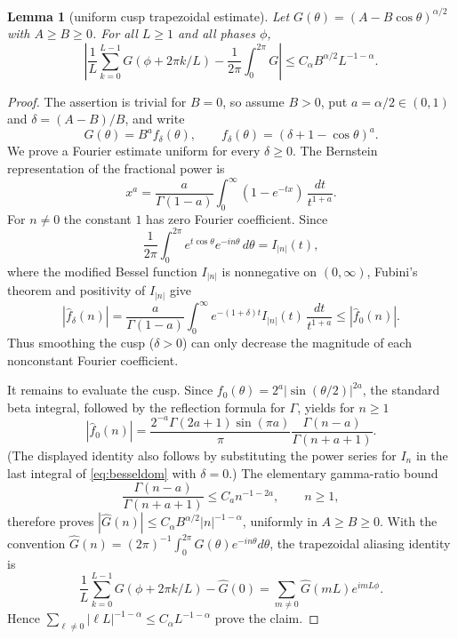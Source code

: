 \documentclass[11pt]{amsart}
\newtheorem{lemma}[theorem]{Lemma}
\begin{document}
\begin{lemma}[uniform cusp trapezoidal estimate]\label{lem:trap}
Let $G(\theta)=(A-B\cos\theta)^{\alpha/2}$ with $A\ge B\ge0$.  For all
$L\ge1$ and all phases $\phi$,
\[
 \left|\frac1L\sum_{k=0}^{L-1}G(\phi+2\pi k/L)
 -\frac1{2\pi}\int_0^{2\pi}G\right|
 \le C_\alpha B^{\alpha/2}L^{-1-\alpha}.             \tag{4.1}
\]
\end{lemma}

\begin{proof}
The assertion is trivial for $B=0$, so assume $B>0$, put
$a=\alpha/2\in(0,1)$ and $\delta=(A-B)/B$, and write
\[
 G(\theta)=B^a f_\delta(\theta),\qquad
 f_\delta(\theta)=(\delta+1-\cos\theta)^a.
\]
We prove a Fourier estimate uniform for every $\delta\ge0$.  The Bernstein
representation of the fractional power is
\[
 x^a=\frac{a}{\Gamma(1-a)}\int_0^\infty
 (1-e^{-tx})\,\frac{dt}{t^{1+a}}.
\]
For $n\ne0$ the constant $1$ has zero Fourier coefficient.  Since
\[
 \frac1{2\pi}\int_0^{2\pi}e^{t\cos\theta}e^{-in\theta}\,d\theta=I_{|n|}(t),
\]
where the modified Bessel function $I_{|n|}$ is nonnegative on $(0,\infty)$,
Fubini's theorem and positivity of $I_{|n|}$ give
\begin{equation}\label{eq:besseldom}
 |\widehat f_\delta(n)|
 =\frac{a}{\Gamma(1-a)}\int_0^\infty
 e^{-(1+\delta)t}I_{|n|}(t)\,\frac{dt}{t^{1+a}}
 \le |\widehat f_0(n)|.                              \tag{4.2}
\end{equation}
Thus smoothing the cusp ($\delta>0$) can only decrease the magnitude of
each nonconstant Fourier coefficient.

It remains to evaluate the cusp.  Since
$f_0(\theta)=2^a|\sin(\theta/2)|^{2a}$, the standard beta integral, followed
by the reflection formula for $\Gamma$, yields for $n\ge1$
\[
 |\widehat f_0(n)|
 =\frac{2^{-a}\Gamma(2a+1)\sin(\pi a)}{\pi}
   \frac{\Gamma(n-a)}{\Gamma(n+a+1)}.                \tag{4.3}
\]
(The displayed identity also follows by substituting the power series for
$I_n$ in the last integral of \eqref{eq:besseldom} with $\delta=0$.)
The elementary gamma-ratio bound
\[
 \frac{\Gamma(n-a)}{\Gamma(n+a+1)}
 \le C_a n^{-1-2a},\qquad n\ge1,
\]
therefore proves
$|\widehat G(n)|\le C_\alpha B^{\alpha/2}|n|^{-1-\alpha}$, uniformly in
$A\ge B\ge0$.
With the convention
$\widehat G(n)=(2\pi)^{-1}\int_0^{2\pi}G(\theta)e^{-in\theta}d\theta$,
the trapezoidal aliasing identity is
\[
 \frac1L\sum_{k=0}^{L-1}G(\phi+2\pi k/L)-\widehat G(0)
 =\sum_{m\ne0}\widehat G(mL)e^{imL\phi}.
\]
Hence
$\sum_{\ell\ne0}|\ell L|^{-1-\alpha}\le C_\alpha L^{-1-\alpha}$ prove
the claim.
\end{proof}
\end{document}
